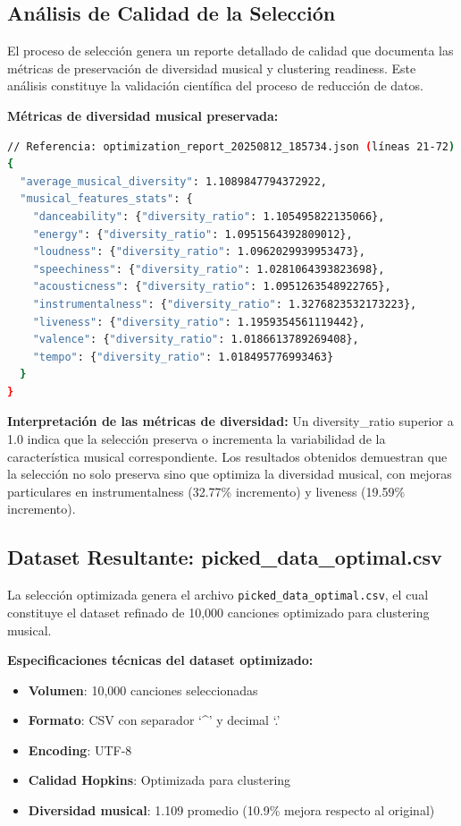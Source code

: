 \documentclass[12pt,a4paper]{report}
\begin{document}
\subsection{Análisis de Calidad de la Selección}

El proceso de selección genera un reporte detallado de calidad que documenta las métricas de preservación de diversidad musical y clustering readiness. Este análisis constituye la validación científica del proceso de reducción de datos.

\textbf{Métricas de diversidad musical preservada:}
\begin{lstlisting}[language=bash]
// Referencia: optimization_report_20250812_185734.json (líneas 21-72)
{
  "average_musical_diversity": 1.1089847794372922,
  "musical_features_stats": {
    "danceability": {"diversity_ratio": 1.105495822135066},
    "energy": {"diversity_ratio": 1.0951564392809012},
    "loudness": {"diversity_ratio": 1.0962029939953473},
    "speechiness": {"diversity_ratio": 1.0281064393823698},
    "acousticness": {"diversity_ratio": 1.0951263548922765},
    "instrumentalness": {"diversity_ratio": 1.3276823532173223},
    "liveness": {"diversity_ratio": 1.1959354561119442},
    "valence": {"diversity_ratio": 1.0186613789269408},
    "tempo": {"diversity_ratio": 1.018495776993463}
  }
}
\end{lstlisting}

\textbf{Interpretación de las métricas de diversidad:}
Un diversity\_ratio superior a 1.0 indica que la selección preserva o incrementa la variabilidad de la característica musical correspondiente. Los resultados obtenidos demuestran que la selección no solo preserva sino que optimiza la diversidad musical, con mejoras particulares en instrumentalness (32.77\% incremento) y liveness (19.59\% incremento).

\subsection{Dataset Resultante: picked\_data\_optimal.csv}

La selección optimizada genera el archivo \texttt{picked\_data\_optimal.csv}, el cual constituye el dataset refinado de 10,000 canciones optimizado para clustering musical.

\textbf{Especificaciones técnicas del dataset optimizado:}
\begin{itemize}[leftmargin=*]
    \item \textbf{Volumen}: 10,000 canciones seleccionadas
    \item \textbf{Formato}: CSV con separador `\^{}' y decimal `.'
    \item \textbf{Encoding}: UTF-8
    \item \textbf{Calidad Hopkins}: Optimizada para clustering
    \item \textbf{Diversidad musical}: 1.109 promedio (10.9\% mejora respecto al original)
\end{itemize}
\end{document}

